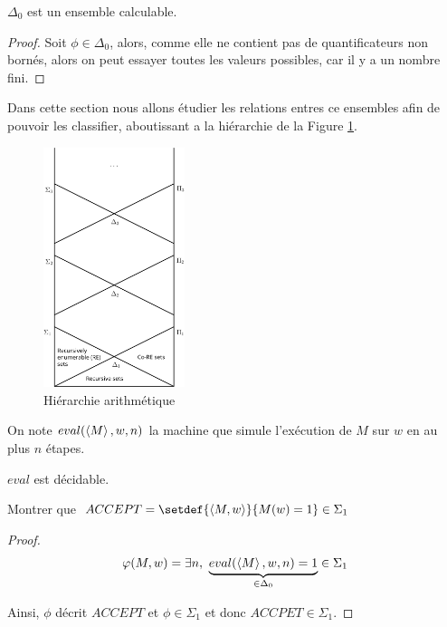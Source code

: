 \begin{prop}
	$\Delta_0$ est un ensemble calculable.
\end{prop}

\begin{proof}
	Soit $\phi \in \Delta_0$, alors, comme elle ne contient pas de quantificateurs non bornés, alors on peut essayer toutes les valeurs possibles, car il y a un nombre
	fini.
\end{proof}


Dans cette section nous allons étudier les relations entres ce ensembles afin de pouvoir les classifier, aboutissant a la hiérarchie de la Figure \ref{fig:arith-hier}.


\begin{figure}[h]
	\begin{center}
		\includegraphics[height=7cm]{./images/Arithmetic_hierarchy.png}
	\end{center}
	\caption{Hiérarchie arithmétique}
	\label{fig:arith-hier}
\end{figure}


\begin{definition}[eval]
	On note $eval(\left\langle M\right\rangle, w, n)$ la machine que simule l'exécution de $M$ sur $w$ en au plus $n$ étapes.
\end{definition}

\begin{prop}[Admis]
	$eval$ est décidable.
\end{prop}


\begin{exercice}
	Montrer que $ACCEPT = \setdef {\encode {M,w}} {M(w) = 1} \in \Sigma_1$
\end{exercice}

\begin{proof}
	$$\varphi (M,w) =  \exists n, \ \underbrace{eval(\left\langle M\right\rangle, w, n) = 1}_{\in \Delta_0} \in \Sigma_1$$

	Ainsi, $\phi$ décrit $ACCEPT$ et $\phi \in \Sigma_1$ et donc $ACCPET \in \Sigma_1$.
\end{proof}


